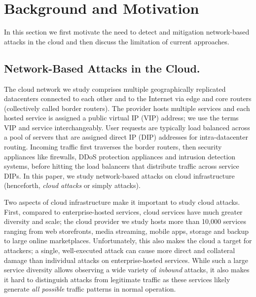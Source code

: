 \section{Background and Motivation}

In this section we first motivate the need to detect and mitigation
network-based attacks in the cloud and then discuss the limitation of current 
approaches.

\subsection{Network-Based Attacks in the Cloud.}
The cloud network we study comprises multiple geographically
replicated datacenters connected to each other and to the Internet via
edge and core routers (collectively called border routers).
%
The provider hosts multiple services and each hosted service is
assigned a public virtual IP (VIP) address; we use
the terms VIP and service interchangeably.
%
User requests are typically load balanced across a pool of servers
that are assigned direct IP (DIP) addresses for intra-datacenter
routing. 
%
Incoming traffic first traverses the border routers, then security
appliances like firewalls, DDoS protection appliances and intrusion detection systems, before
hitting the load balancers that distribute traffic across service DIPs.
%
In this paper, we study network-based attacks on cloud infrastructure
(henceforth, \emph{cloud attacks} or simply attacks).

Two aspects of cloud infrastructure make it important to study cloud
attacks.
%
First, compared to enterprise-hosted services, cloud services have
much greater diversity and scale; the cloud provider we study hosts
more than 10,000 services ranging from web storefronts, media streaming,
mobile apps, storage and backup to large online marketplaces. 
%
Unfortunately, this also makes the cloud a %
target for attackers; a single, well-executed attack can cause more direct
and collateral damage than individual attacks on enterprise-hosted services.
%
While such a large service diversity allows observing 
a wide variety of \emph{inbound} attacks, it 
also makes it hard to distinguish attacks from legitimate traffic 
as these services likely generate {\em all possible} traffic patterns in normal operation.
%


